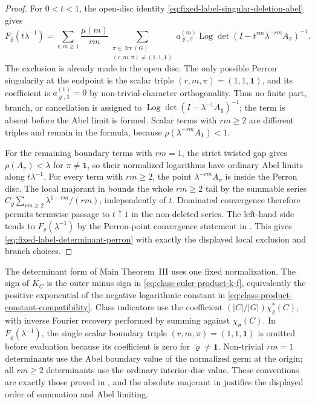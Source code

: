 \documentclass[11pt,a4paper]{amsart}
\theoremstyle{plain}
\theoremstyle{definition}
\theoremstyle{remark}
\DeclareMathOperator{\Irr}{Irr}
\DeclareMathOperator{\Log}{Log}
\begin{document}
\begin{proof}
  For \(0<t<1\), the open-disc identity
  \eqref{eq:fixed-label-singular-deletion-abel} gives
  \[
    F_\varrho(t\lambda^{-1})
    =
    \sum_{r,m\ge1}\frac{\mu(m)}{rm}
      \sum_{\substack{\pi\in\Irr(G)\\(r,m,\pi)\neq(1,1,\mathbf1)}}
        a_{\varrho,\pi}^{(m)}
        \Log\det(I-t^{rm}\lambda^{-rm}A_\pi)^{-1}.
  \]
  The exclusion is already made in the open disc.  The only possible Perron
  singularity at the endpoint is the scalar triple
  \((r,m,\pi)=(1,1,\mathbf1)\), and its coefficient is
  \(a_{\varrho,\mathbf1}^{(1)}=0\) by non-trivial-character orthogonality.
  Thus no finite part, branch, or cancellation is assigned to
  \(\Log\det(I-\lambda^{-1}A_{\mathbf1})^{-1}\); the term is absent before
  the Abel limit is formed.  Scalar terms with \(rm\ge2\) are different
  triples and remain in the formula, because
  \(\rho(\lambda^{-rm}A_{\mathbf1})<1\).

  For the remaining boundary terms with \(rm=1\), the strict twisted gap gives
  \(\rho(A_\pi)<\lambda\) for \(\pi\ne\mathbf1\), so their normalized logarithms
  have ordinary Abel limits along \(t\lambda^{-1}\).  For every term with
  \(rm\ge2\), the point \(\lambda^{-rm}A_\pi\) is inside the Perron disc.  The
  local majorant in  bounds
  the whole \(rm\ge2\) tail by the summable series
  \(C_\varrho\sum_{rm\ge2}\lambda^{1-rm}/(rm)\), independently of \(t\).
  Dominated convergence therefore permits termwise passage to
  \(t\uparrow1\) in the non-deleted series.  The left-hand side tends to
  \(F_\varrho(\lambda^{-1})\) by the Perron-point convergence statement in
  .  This gives
  \eqref{eq:fixed-label-determinant-perron} with exactly the displayed local
  exclusion and branch choices.
\end{proof}

The determinant form of Main Theorem~III uses one fixed normalization.  The
sign of \(K_C\) is the outer minus sign in
\eqref{eq:class-euler-product-k-f}, equivalently the positive exponential of
the negative logarithmic constant in
\eqref{eq:class-product-constant-compatibility}.  Class indicators use the
coefficient \((|C|/|G|)\chi_\varrho^\ast(C)\), with inverse Fourier recovery
performed by summing against \(\chi_\sigma(C)\).  In
\(F_\varrho(\lambda^{-1})\), the single scalar boundary triple
\((r,m,\pi)=(1,1,\mathbf1)\) is omitted before evaluation because its
coefficient is zero for \(\varrho\ne\mathbf1\).  Non-trivial \(rm=1\)
determinants use the Abel boundary value of the normalized germ at the origin;
all \(rm\ge2\) determinants use the ordinary interior-disc value.  These
conventions are exactly those proved in
, and the absolute majorant in
 justifies the displayed order
of summation and Abel limiting.
\end{document}
